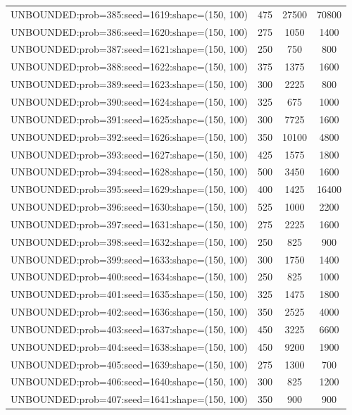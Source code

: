 \begin{longtable}{lccc}
UNBOUNDED:prob=385:seed=1619:shape=(150, 100) &      475 & 27500 &  70800 \\
UNBOUNDED:prob=386:seed=1620:shape=(150, 100) &      275 &  1050 &   1400 \\
UNBOUNDED:prob=387:seed=1621:shape=(150, 100) &      250 &   750 &    800 \\
UNBOUNDED:prob=388:seed=1622:shape=(150, 100) &      375 &  1375 &   1600 \\
UNBOUNDED:prob=389:seed=1623:shape=(150, 100) &      300 &  2225 &    800 \\
UNBOUNDED:prob=390:seed=1624:shape=(150, 100) &      325 &   675 &   1000 \\
UNBOUNDED:prob=391:seed=1625:shape=(150, 100) &      300 &  7725 &   1600 \\
UNBOUNDED:prob=392:seed=1626:shape=(150, 100) &      350 & 10100 &   4800 \\
UNBOUNDED:prob=393:seed=1627:shape=(150, 100) &      425 &  1575 &   1800 \\
UNBOUNDED:prob=394:seed=1628:shape=(150, 100) &      500 &  3450 &   1600 \\
UNBOUNDED:prob=395:seed=1629:shape=(150, 100) &      400 &  1425 &  16400 \\
UNBOUNDED:prob=396:seed=1630:shape=(150, 100) &      525 &  1000 &   2200 \\
UNBOUNDED:prob=397:seed=1631:shape=(150, 100) &      275 &  2225 &   1600 \\
UNBOUNDED:prob=398:seed=1632:shape=(150, 100) &      250 &   825 &    900 \\
UNBOUNDED:prob=399:seed=1633:shape=(150, 100) &      300 &  1750 &   1400 \\
UNBOUNDED:prob=400:seed=1634:shape=(150, 100) &      250 &   825 &   1000 \\
UNBOUNDED:prob=401:seed=1635:shape=(150, 100) &      325 &  1475 &   1800 \\
UNBOUNDED:prob=402:seed=1636:shape=(150, 100) &      350 &  2525 &   4000 \\
UNBOUNDED:prob=403:seed=1637:shape=(150, 100) &      450 &  3225 &   6600 \\
UNBOUNDED:prob=404:seed=1638:shape=(150, 100) &      450 &  9200 &   1900 \\
UNBOUNDED:prob=405:seed=1639:shape=(150, 100) &      275 &  1300 &    700 \\
UNBOUNDED:prob=406:seed=1640:shape=(150, 100) &      300 &   825 &   1200 \\
UNBOUNDED:prob=407:seed=1641:shape=(150, 100) &      350 &   900 &    900 \\

\end{longtable}
